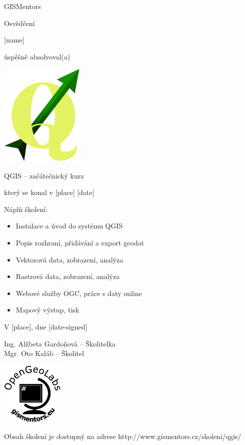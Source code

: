 \documentclass[12pt, a4paper]{letter}
\begin{document}
\pagestyle{empty}
\begin{center}

{\Large GISMentors}

{\Huge Osvědčení}

{\Large [name]}

úspěšně absolvoval(a)

\includegraphics[width=0.30\textwidth]{../images/qgislogo_vector.eps}

{\Large QGIS -- začátečnický kurz}

který se konal v [place] [date]
\end{center}

Náplň školení:

\begin{itemize}
    \item Instalace a úvod do systému QGIS
    \item Popis rozhraní, přidávání a export geodat
    \item Vektorová data, zobrazení, analýza
    \item Rastrová data, zobrazení, analýza
    \item Webové služby OGC, práce s daty online
    \item Mapový výstup, tisk
\end{itemize}

\vfill
\parbox{7cm}{

    V [place], dne [date-signed]\\

\vfill

    Ing. Alžbeta Gardoňová -- Školitelka\\

\vfill
    Mgr. Oto Kaláb -- Školitel
}
\hfill
\parbox{3cm}{
    \includegraphics[width=3cm]{../images/placka.eps}
}


\begin{center}
{\footnotesize Obsah školení je dostupný na adrese
http://www.gismentors.cz/skoleni/qgis/}
\end{center}
\end{document}
